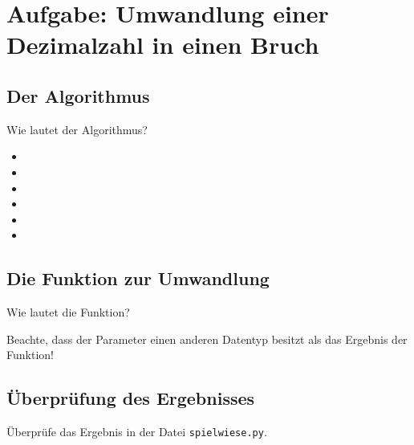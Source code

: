 \section{Aufgabe: Umwandlung einer Dezimalzahl in einen Bruch}

\subsection*{Der Algorithmus}

Wie lautet der Algorithmus?

{\Large
	\begin{itemize}
		\item  
		\item  
		\item  
		\item  
		\item  
		\item  
	\end{itemize}
}

\subsection*{Die Funktion zur Umwandlung}

Wie lautet die Funktion?

Beachte, dass der Parameter einen anderen Datentyp besitzt als das Ergebnis der Funktion!


\subsection*{Überprüfung des Ergebnisses}

Überprüfe das Ergebnis in der Datei \texttt{spielwiese.py}.